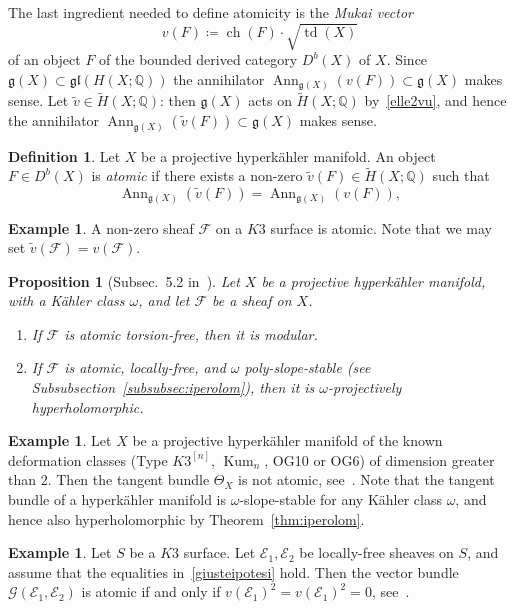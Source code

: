 \documentclass[11pt]{amsart}
\newcommand{\QQ}{{\mathbb Q}}
\let\mathcal\mathscr
\def\cE{\mathcal{E}}
\def\cF{\mathcal{F}}
\def\cG{\mathcal{G}}
\def\gotg{\mathfrak g}
\def\gotl{\mathfrak l}
\DeclareMathOperator{\Ann}{Ann}
\DeclareMathOperator{\ch}{ch}
\DeclareMathOperator{\Kum}{Kum}
\DeclareMathOperator{\td}{td}
\newcommand{\wt}{\widetilde}
\newtheorem{prp}[lmm]{Proposition}
\theoremstyle{definition}
\newtheorem{dfn}[lmm]{Definition}
\newtheorem{expl}[lmm]{Example}
\theoremstyle{remark}
\begin{document}
The last ingredient needed to define atomicity is the \emph{Mukai vector}
%
\begin{equation}
%
v(F)\coloneqq \ch(F)\cdot\sqrt{\td(X)}
%
\end{equation}
%
of an object $F$ of the bounded derived category $D^b(X)$ of $X$. Since $\gotg(X)\subset \gotg\gotl(H(X;\QQ))$ the annihilator 
$\Ann_{\gotg(X)}(v(F))\subset \gotg(X)$ makes sense. Let $\wt{v}\in \wt{H}(X;\QQ)$:  
 then  $\gotg(X)$ acts on $\wt{H}(X;\QQ)$ by~\eqref{elle2vu}, and hence the annihilator 
$\Ann_{\gotg(X)}(\wt{v}(F))\subset \gotg(X)$ makes sense. 
%
\begin{dfn}\label{dfn:eccoatomico}
%
Let $X$ be   a projective hyperk\"ahler manifold. An object $F\in D^b(X)$ is \emph{atomic} if there exists a non-zero $\wt{v}(F)\in \wt{H}(X;\QQ)$ such that 
%
\begin{equation}
%
\Ann_{\gotg(X)}(\wt{v}(F))=\Ann_{\gotg(X)}(v(F)),
%
\end{equation}
%
%
\end{dfn}
%
%
\begin{expl}
%
A non-zero sheaf $\cF$ on a $K3$ surface is atomic. Note that we may set $\wt{v}(\cF)=v(\cF)$. 
%
\end{expl}
%
%
\begin{prp}[Subsec.~5.2 in~\cite{beckmann:atomic}]
%
Let $X$ be   a projective hyperk\"ahler manifold, with a K\"ahler class $\omega$, and let $\cF$ be a sheaf on $X$.
%
\begin{enumerate}
%
\item
%
If $\cF$ is  atomic torsion-free, then it is   modular.
%
\item
%
If $\cF$ is  atomic, locally-free, and $\omega$ poly-slope-stable (see Subsubsection~\ref{subsubsec:iperolom}), then it is $\omega$-projectively hyperholomorphic.
%
\end{enumerate}
%
%
\end{prp}
%
%
\begin{expl}
%
Let $X$ be   a projective hyperk\"ahler manifold of the known deformation classes (Type $K3^{[n]}$, $\Kum_n$, OG10 or OG6) of dimension greater than $2$. Then the tangent bundle $\Theta_X$ is not atomic, see~\cite[Prop.~8.3]{beckmann:atomic}. Note that the tangent bundle of a  hyperk\"ahler manifold is $\omega$-slope-stable for any K\"ahler class $\omega$, and hence also hyperholomorphic by Theorem~\ref{thm:iperolom}. 
%
\end{expl}
%
%
\begin{expl}
%
Let $S$ be a $K3$ surface.  Let $\cE_1,\cE_2$ be  locally-free sheaves on $S$, and assume that the equalities in~\eqref{giusteipotesi} hold. 
 Then the vector bundle $\cG(\cE_1,\cE_2)$ is atomic if and only if $v(\cE_1)^2=v(\cE_1)^2=0$, see~\cite[Prop.~4.1]{og:highdim}. 
%
\end{expl}
\end{document}
